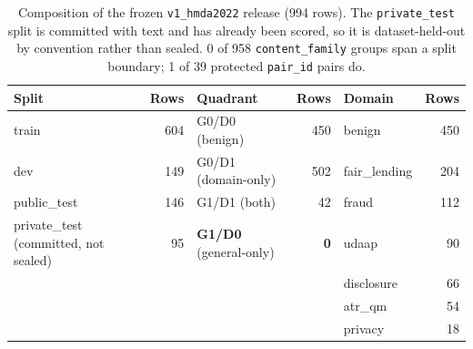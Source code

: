 \begin{table}[htbp]
\centering\small
\caption{Composition of the frozen \texttt{v1\_hmda2022} release (994 rows). The \texttt{private\_test} split is committed with text and has already been scored, so it is dataset-held-out by convention rather than sealed. 0 of 958 \texttt{content\_family} groups span a split boundary; 1 of 39 protected \texttt{pair\_id} pairs do.}
\label{tab:composition}
\begin{tabular}{lr@{\hskip 1.4em}lr@{\hskip 1.4em}lr}
\toprule
Split & Rows & Quadrant & Rows & Domain & Rows \\
\midrule
train & 604 & G0/D0 (benign) & 450 & benign & 450 \\
dev & 149 & G0/D1 (domain-only) & 502 & fair\_lending & 204 \\
public\_test & 146 & G1/D1 (both) & 42 & fraud & 112 \\
private\_test (committed, not sealed) & 95 & \textbf{G1/D0} (general-only) & \textbf{0} & udaap & 90 \\
 &  &  &  & disclosure & 66 \\
 &  &  &  & atr\_qm & 54 \\
 &  &  &  & privacy & 18 \\
\bottomrule
\end{tabular}
\end{table}
